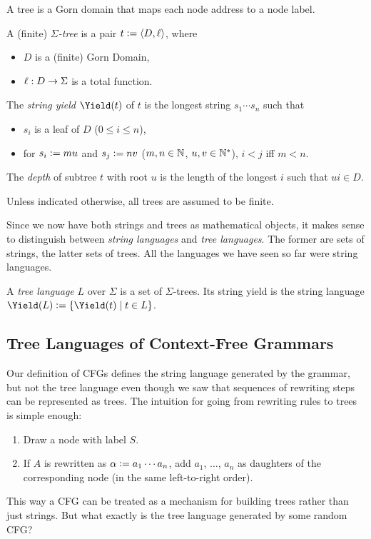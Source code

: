 A tree is a Gorn domain that maps each node address to a node label.
%
\begin{definition}[Tree]
    A (finite) \emph{$\Sigma$-tree} is a pair $t \mathrel{\mathop:}= \left \langle D,\ell \right \rangle $, where
    \begin{itemize}
        \item $D$ is a (finite) Gorn Domain,
        \item $\ell: D \rightarrow \Sigma$ is a total function.
    \end{itemize}
    The \emph{string yield} $\Yield(t)$ of $t$ is the longest string $s_1 \cdots s_n$ such that
    \begin{itemize}
        \item $s_i$ is a leaf of $D$ ($0 \leq i \leq n$),
        \item for  $s_i \mathrel{\mathop:}= mu$ and $s_j \mathrel{\mathop:}= nv$ ($m,n \in \mathbb{N}$, $u,v \in \mathbb{N}^*$), $i < j$ iff $m < n$.
    \end{itemize}
    The \emph{depth} of subtree $t$ with root $u$ is the length of the longest $i$ such that $ui \in D$.
\end{definition}
%
Unless indicated otherwise, all trees are assumed to be finite.

Since we now have both strings and trees as mathematical objects, it makes sense to distinguish between \emph{string languages} and \emph{tree languages}.
The former are sets of strings, the latter sets of trees.
All the languages we have seen so far were string languages.
%
\begin{definition}
    A \emph{tree language} $L$ over $\Sigma$ is a set of $\Sigma$-trees.
    Its string yield is the string language $\Yield(L) \is \setof{ \Yield(t) \mid t \in L }$.
\end{definition}


\subsection{Tree Languages of Context-Free Grammars}

Our definition of CFGs defines the string language generated by the grammar, but not the tree language even though we saw that sequences of rewriting steps can be represented as trees.
The intuition for going from rewriting rules to trees is simple enough:
%
\begin{enumerate}
    \item Draw a node with label $S$.
    \item If $A$ is rewritten as $\alpha \mathrel{\mathop:}= a_1 \cdots a_n$, add $a_1$, $\ldots$, $a_n$ as daughters of the corresponding node (in the same left-to-right order).
\end{enumerate}
%
This way a CFG can be treated as a mechanism for building trees rather than just strings.
But what exactly is the tree language generated by some random CFG?

